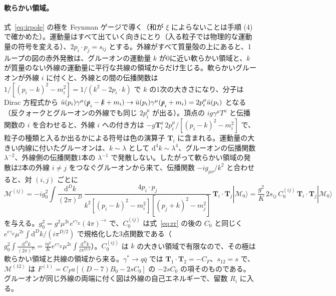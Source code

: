 \documentclass[a4paper,10pt]{ltjsarticle}
\newcommand{\dd}{\mathrm{d}}
\begin{document}
\paragraph{軟らかい領域。}式~\eqref{eq:irpole} の極を Feynman ゲージで導く（和が $\xi$ によらないことは手順 (4) で確かめた）。運動量はすべて出ていく向きにとり（入る粒子では物理的な運動量の符号を変える）、$2p_i\cdot p_j=s_{ij}$ とする。外線がすべて質量殻の上にあると、1ループの図の赤外発散は、グルーオンの運動量 $k$ が0に近い軟らかい領域と、$k$ が質量のない外線の運動量に平行な共線の領域からだけ生じる。軟らかいグルーオンが外線 $i$ に付くと、外線との間の伝播関数は $1/[(p_i-k)^2-m_i^2]=1/(k^2-2p_i\cdot k)$ で $k$ の1次の大きさになり、分子は Dirac 方程式から $\bar u(p_i)\gamma^\mu(\slashed p_i-\slashed k+m_i)\to\bar u(p_i)\gamma^\mu(\slashed p_i+m_i)=2p_i^\mu\bar u(p_i)$ となる（反クォークとグルーオンの外線でも同じ $2p_i^\mu$ が出る）。頂点の $ig\gamma^\mu T^a$ と伝播関数の $i$ を合わせると、外線 $i$ への付き方は $-g\boldsymbol T_i^a\,2p_i^\mu/[(p_i-k)^2-m_i^2]$ で、粒子の種類と入るか出るかによる符号は色の演算子 $\boldsymbol T_i$ に含まれる。運動量の大きい内線に付いたグルーオンは、$k\sim\lambda$ として $\dd^4k\sim\lambda^4$、グルーオンの伝播関数 $\lambda^{-2}$、外線側の伝播関数1本の $\lambda^{-1}$ で発散しない。したがって軟らかい領域の発散は2本の外線 $i\ne j$ をつなぐグルーオンから来て、伝播関数 $-ig_{\mu\nu}/k^2$ と合わせると、対 $(i,j)$ ごとに
\begin{equation*}
\mathcal M^{(ij)}=-ig_0^2\int\frac{\dd^Dk}{(2\pi)^D}\,\frac{4p_i\cdot p_j}{k^2[(p_i-k)^2-m_i^2][(p_j+k)^2-m_j^2]}\,\boldsymbol T_i\!\cdot\!\boldsymbol T_j|\mathcal M_0\rangle
=\frac{g^2}{K}\,2s_{ij}\,C_0^{(ij)}\,\boldsymbol T_i\!\cdot\!\boldsymbol T_j|\mathcal M_0\rangle
\end{equation*}
を与える。$g_0^2=g^2\mu^{2\epsilon}e^{\epsilon\gamma_E}(4\pi)^{-\epsilon}$ で、$C_0^{(ij)}$ は式~\eqref{eq:rr} の後の $C_0$ と同じく $e^{\epsilon\gamma_E}\mu^{2\epsilon}\int\dd^Dk/(i\pi^{D/2})$ で規格化した3点関数である（$g_0^2\int\frac{\dd^Dk}{(2\pi)^D}=\frac{ig^2}{K}e^{\epsilon\gamma_E}\mu^{2\epsilon}\int\frac{\dd^Dk}{i\pi^{D/2}}$）。$C_0^{(ij)}$ は $k$ の大きい領域で有限なので、その極は軟らかい領域と共線の領域から来る。$\gamma^*\to q\bar q$ では $\boldsymbol T_1\cdot\boldsymbol T_2=-C_F$、$s_{12}=s$ で、$\mathcal M^{(12)}$ は $F^{(1)}=C_Fa[(D-7)B_0-2sC_0]$ の $-2sC_0$ の項そのものである。グルーオンが同じ外線の両端に付く図は外線の自己エネルギーで、留数 $R_i$ に入る。
\end{document}
